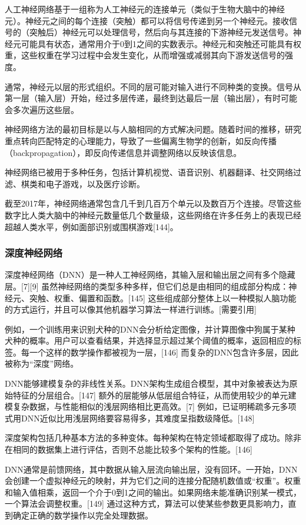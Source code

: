 人工神经网络基于一组称为人工神经元的连接单元（类似于生物大脑中的神经元）。神经元之间的每个连接（突触）都可以将信号传递到另一个神经元。接收信号的（突触后）神经元可以处理信号，然后向与其连接的下游神经元发送信号。神经元可能具有状态，通常用介于0到1之间的实数表示。神经元和突触还可能具有权重，这些权重在学习过程中会发生变化，从而增强或减弱其向下游发送信号的强度。

通常，神经元以层的形式组织。不同的层可能对输入进行不同种类的变换。信号从第一层（输入层）开始，经过多层传递，最终到达最后一层（输出层），有时可能会多次遍历这些层。

神经网络方法的最初目标是以与人脑相同的方式解决问题。随着时间的推移，研究重点转向匹配特定的心理能力，导致了一些偏离生物学的创新，如反向传播（backpropagation），即反向传递信息并调整网络以反映该信息。

神经网络已被用于多种任务，包括计算机视觉、语音识别、机器翻译、社交网络过滤、棋类和电子游戏，以及医疗诊断。

截至2017年，神经网络通常包含几千到几百万个单元以及数百万个连接。尽管这些数字比人类大脑中的神经元数量低几个数量级，这些网络在许多任务上的表现已经超越人类水平，例如面部识别或围棋游戏[144]。
\subsubsection{深度神经网络} 
深度神经网络（DNN）是一种人工神经网络，其输入层和输出层之间有多个隐藏层。[7][9] 虽然神经网络的类型多种多样，但它们总是由相同的组成部分构成：神经元、突触、权重、偏置和函数。[145] 这些组成部分整体上以一种模拟人脑功能的方式运行，并且可以像其他机器学习算法一样进行训练。[需要引用]  

例如，一个训练用来识别犬种的DNN会分析给定图像，并计算图像中狗属于某种犬种的概率。用户可以查看结果，并选择显示超过某个阈值的概率，返回相应的标签。每一个这样的数学操作都被视为一层，[146] 而复杂的DNN包含许多层，因此被称为“深度”网络。  

DNN能够建模复杂的非线性关系。DNN架构生成组合模型，其中对象被表达为原始特征的分层组合。[147] 额外的层能够从低层组合特征，从而使用较少的单元建模复杂数据，与性能相似的浅层网络相比更高效。[7] 例如，已证明稀疏多元多项式用DNN近似比用浅层网络要容易得多，其难度呈指数级降低。[148]  

深度架构包括几种基本方法的多种变体。每种架构在特定领域都取得了成功。除非在相同的数据集上进行评估，否则不总能比较多个架构的性能。[146]  

DNN通常是前馈网络，其中数据从输入层流向输出层，没有回环。一开始，DNN会创建一个虚拟神经元的映射，并为它们之间的连接分配随机数值或“权重”。权重和输入值相乘，返回一个介于0到1之间的输出。如果网络未能准确识别某一模式，一个算法会调整权重。[149] 通过这种方式，算法可以使某些参数更具影响力，直到确定正确的数学操作以完全处理数据。  


